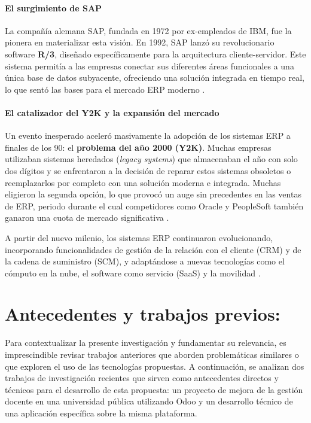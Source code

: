 \documentclass[12pt,letterpaper,spanish]{report}
\begin{document}
\paragraph{El surgimiento de SAP} La compañía alemana SAP, fundada en 1972 por ex-empleados de IBM, fue la pionera en materializar esta visión. En 1992, SAP lanzó su revolucionario software \textbf{R/3}, diseñado específicamente para la arquitectura cliente-servidor. Este sistema permitía a las empresas conectar sus diferentes áreas funcionales a una única base de datos subyacente, ofreciendo una solución integrada en tiempo real, lo que sentó las bases para el mercado ERP moderno \cite{book}.

\paragraph{El catalizador del Y2K y la expansión del mercado} Un evento inesperado aceleró masivamente la adopción de los sistemas ERP a finales de los 90: el \textbf{problema del año 2000 (Y2K)}. Muchas empresas utilizaban sistemas heredados (\textit{legacy systems}) que almacenaban el año con solo dos dígitos y se enfrentaron a la decisión de reparar estos sistemas obsoletos o reemplazarlos por completo con una solución moderna e integrada. Muchas eligieron la segunda opción, lo que provocó un auge sin precedentes en las ventas de ERP, periodo durante el cual competidores como Oracle y PeopleSoft también ganaron una cuota de mercado significativa \cite{book}.

A partir del nuevo milenio, los sistemas ERP continuaron evolucionando, incorporando funcionalidades de gestión de la relación con el cliente (CRM) y de la cadena de suministro (SCM), y adaptándose a nuevas tecnologías como el cómputo en la nube, el software como servicio (SaaS) y la movilidad \cite{book}.


\section{Antecedentes y trabajos previos:}
\label{sec:antecedentes}

Para contextualizar la presente investigación y fundamentar su relevancia, es imprescindible revisar trabajos anteriores que aborden problemáticas similares o que exploren el uso de las tecnologías propuestas. A continuación, se analizan dos trabajos de investigación recientes que sirven como antecedentes directos y técnicos para el desarrollo de esta propuesta: un proyecto de mejora de la gestión docente en una universidad pública utilizando Odoo y un desarrollo técnico de una aplicación específica sobre la misma plataforma.
\end{document}
